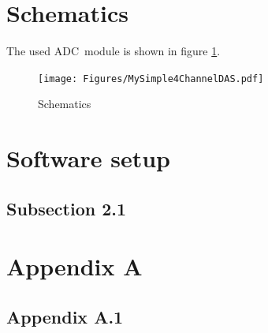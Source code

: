 \documentclass[11pt, oneside]{scrartcl}   	%
\begin{document}
\newpage
\section{Schematics}
The used ADC module is shown in figure \ref{fig:Schematics}.
\begin{figure}[htbp]
	\centering
	\label{fig:Schematics}
	\texttt{[image: Figures/MySimple4ChannelDAS.pdf]}
	\caption[Schematics]{Schematics}
\end{figure}

\newpage
\section{Software setup}
\subsection{Subsection 2.1}

\newpage

\appendix
\section{Appendix A}
\subsection{Appendix A.1}	
\end{document}
